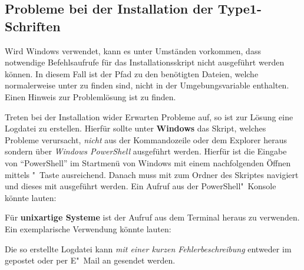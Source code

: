 \subsection{Probleme bei der Installation der Type1-Schriften}
%
Wird Windows verwendet, kann es unter Umständen vorkommen, dass notwendige 
Befehlsaufrufe für das Installationsskript nicht ausgeführt werden können. In 
diesem Fall ist der Pfad zu den benötigten Dateien, welche normalerweise unter 
 zu finden sind, nicht in der 
Umgebungsvariable  enthalten. Einen Hinweis zur Problemlösung ist 
zu finden.

Treten bei der Installation wider Erwarten Probleme auf, so ist zur Lösung eine 
Logdatei zu erstellen. Hierfür sollte unter \textbf{Windows} das Skript, 
welches Probleme verursacht, \emph{nicht} aus der Kommandozeile oder dem 
Explorer heraus sondern über \emph{Windows PowerShell} ausgeführt werden. 
Hierfür ist die Eingabe von \enquote{PowerShell} im Startmenü von Windows mit 
einem nachfolgenden Öffnen mittels "~Taste ausreichend. 
Danach muss mit  zum Ordner des Skriptes navigiert und dieses mit 
ausgeführt werden. Ein Aufruf aus der PowerShell"~Konsole könnte lauten:
%
\begin{quoting}[rightmargin=0pt]
  \newline%
\end{quoting}
%
Für \textbf{unixartige Systeme} ist der Aufruf 
 aus dem Terminal heraus zu 
verwenden. Ein exemplarische Verwendung könnte lauten:
%
\begin{quoting}
  \newline
\end{quoting}
%
Die so erstellte Logdatei kann \emph{mit einer kurzen Fehlerbeschreibung} 
entweder im \Forum* gepostet oder per E"~Mail an \mailto{\TUDScriptContact}
gesendet werden.%


